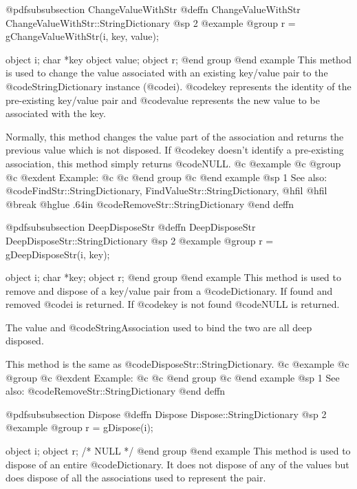 @pdfsubsubsection {ChangeValueWithStr}
@deffn {ChangeValueWithStr} ChangeValueWithStr::StringDictionary
@sp 2
@example
@group
r = gChangeValueWithStr(i, key, value);

object  i;
char    *key
object  value;
object  r;
@end group
@end example
This method is used to change the value associated with an existing
key/value pair to the @code{StringDictionary} instance (@code{i}).
@code{key} represents the identity of the pre-existing key/value
pair and @code{value} represents the new value to be associated with
the key.

Normally, this method changes the value part of the association
and returns the previous value which is not disposed.  If
@code{key} doesn't identify a pre-existing association, this method
simply returns @code{NULL}.
@c @example
@c @group
@c @exdent Example:
@c 
@c @end group
@c @end example
@sp 1
See also:  @code{FindStr::StringDictionary, FindValueStr::StringDictionary, @hfil}
@hfil @break @hglue .64in      @code{RemoveStr::StringDictionary}
@end deffn








@pdfsubsubsection {DeepDisposeStr}
@deffn {DeepDisposeStr} DeepDisposeStr::StringDictionary
@sp 2
@example
@group
r = gDeepDisposeStr(i, key);

object  i;
char    *key;
object  r;
@end group
@end example
This method is used to remove and dispose of a key/value pair from a
@code{Dictionary}.  If found and removed @code{i} is returned.  If @code{key}
is not found @code{NULL} is returned.

The value and @code{StringAssociation} used to bind the two are all deep
disposed.

This method is the same as @code{DisposeStr::StringDictionary}.
@c @example
@c @group
@c @exdent Example:
@c 
@c @end group
@c @end example
@sp 1
See also:  @code{RemoveStr::StringDictionary}
@end deffn













@pdfsubsubsection {Dispose}
@deffn {Dispose} Dispose::StringDictionary
@sp 2
@example
@group
r = gDispose(i);

object  i;
object  r;     /*  NULL  */
@end group
@end example
This method is used to dispose of an entire @code{Dictionary}.  It does not
dispose of any of the values but does dispose of all the associations
used to represent the pair.  

